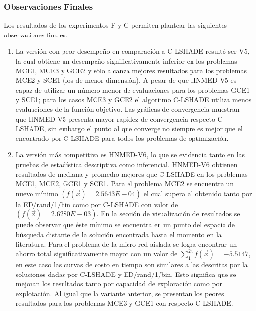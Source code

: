\subsubsection{Observaciones Finales}
Los resultados de los experimentos F y G permiten plantear las siguientes observaciones finales:
\begin{enumerate}
 \item La versión con peor desempeño en comparación a C-LSHADE resultó ser V5, la cual obtiene un desempeño significativamente inferior en los problemas MCE1, MCE3 y GCE2  y sólo alcanza mejores resultados para los problemas MCE2 y SCE1 (los de menor dimensión). A pesar de que HNMED-V5 es capaz de utilizar un número menor de evaluaciones para los problemas GCE1 y SCE1; para los casos MCE3 y GCE2 el algoritmo C-LSHADE utiliza menos evaluaciones de la función objetivo. Las gráficas de convergencia muestran que HNMED-V5 presenta mayor rapidez de convergencia respecto C-LSHADE, sin embargo el punto al que converge no siempre es mejor que el encontrado por C-LSHADE para todos los problemas de optimización.  

 \item  La versión más competitiva es HNMED-V6, lo que se evidencia tanto en las pruebas de estadística descriptiva como inferencial. HNMED-V6 obtienen resultados de mediana y promedio mejores que C-LSHADE en los problemas MCE1, MCE2, GCE1 y SCE1. Para el problema MCE2 se encuentra un nuevo mínimo $(f(\vec{x})=2.5643E-04)$ el cual supera al obtenido tanto por la ED/rand/1/bin como por C-LSHADE con valor de $(f(\vec{x})=2.6280E-03)$. En la sección de visualización de resultados se puede observar que éste mínimo se encuentra en un punto del espacio de búsqueda distante de la solución encontrada hasta el momento en la literatura. Para el problema de la micro-red aislada se logra encontrar un ahorro total significativamente mayor con un valor de $\sum_{1}^{24}f(\vec{x})=-5.5147$, en este caso las curvas de costo en tiempo son similares a las descritas por la soluciones dadas por C-LSHADE y ED/rand/1/bin. Esto significa que se mejoran los resultados tanto por capacidad de exploración como por explotación. Al igual que la variante anterior, se presentan los peores resultados para los problemas MCE3 y GCE1 con respecto C-LSHADE.


\end{enumerate}
